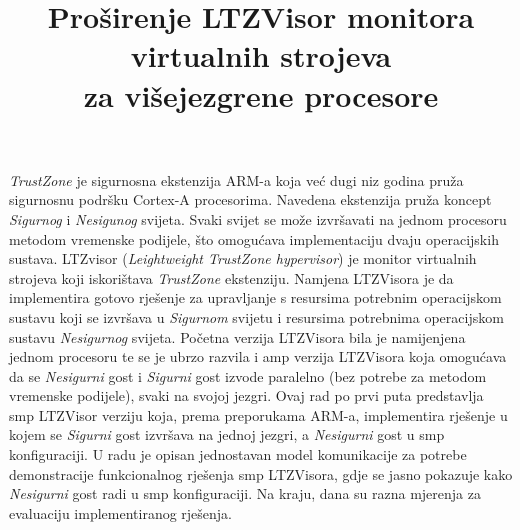 \documentclass[times, utf8, diplomski, numeric]{fer}
\begin{document}
\glsaddall
\printglossary[type=\acronymtype,title=Kazalo pojmova]

\title{Proširenje LTZVisor monitora virtualnih strojeva \\za višejezgrene procesore}
\begin{sazetak}
\textit{TrustZone} je sigurnosna ekstenzija ARM-a koja već dugi niz godina pruža sigurnosnu podršku Cortex-A procesorima.
Navedena ekstenzija pruža koncept \textit{Sigurnog}  i \textit{Nesigunog}  svijeta.
Svaki svijet se može izvršavati na jednom procesoru metodom vremenske podijele, što omogućava implementaciju
dvaju operacijskih sustava. LTZvisor (\textit{Leightweight TrustZone hypervisor}) je monitor virtualnih strojeva koji
iskorištava \textit{TrustZone} ekstenziju. Namjena LTZVisora je da implementira gotovo rješenje za
upravljanje s resursima potrebnim operacijskom sustavu koji se izvršava u \textit{Sigurnom} svijetu i resursima
potrebnima operacijskom sustavu \textit{Nesigurnog} svijeta. Početna verzija LTZVisora bila je namijenjena jednom
procesoru te se je ubrzo razvila i \gls{amp}  verzija LTZVisora koja omogućava da se
\textit{Nesigurni} gost i \textit{Sigurni} gost izvode paralelno (bez potrebe za metodom vremenske podijele), svaki na
svojoj jezgri.
Ovaj rad po prvi puta predstavlja \gls{smp}  LTZVisor verziju koja, prema preporukama ARM-a,
implementira rješenje u kojem se \textit{Sigurni} gost izvršava na jednoj jezgri, a \textit{Nesigurni} gost u \gls{smp}
konfiguraciji. U radu je opisan jednostavan model komunikacije za potrebe demonstracije funkcionalnog rješenja
\gls{smp} LTZVisora, gdje se jasno pokazuje kako \textit{Nesigurni} gost radi u \gls{smp} konfiguraciji. Na kraju, dana su
razna mjerenja za evaluaciju implementiranog rješenja.

\end{sazetak}
\end{document}
